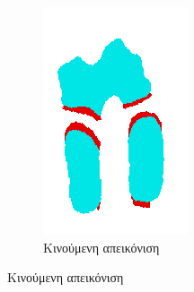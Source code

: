 \documentclass[a4paper,12pt]{article}
\begin{document}
\begin{figure}[H]
\begin{subfigure}[t]{0.4\linewidth}
    \includegraphics[width=\linewidth]{moving_label_after_registration_2.png}
    \caption{Κινούμενη απεικόνιση}
    \end{subfigure}


\end{figure}
\end{document}
